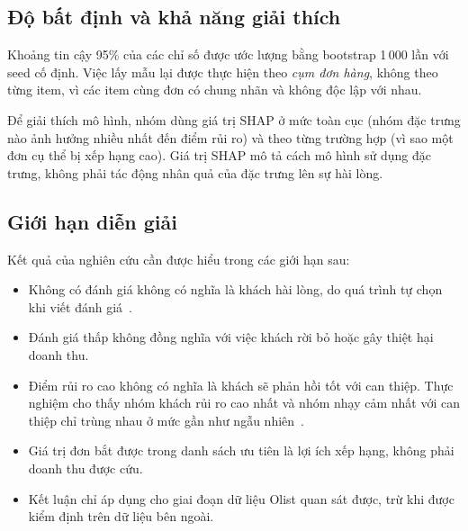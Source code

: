 \subsection{Độ bất định và khả năng giải thích}

Khoảng tin cậy 95\% của các chỉ số được ước lượng bằng bootstrap 1\,000 lần với seed cố định. Việc lấy mẫu lại được thực hiện theo \emph{cụm đơn hàng}, không theo từng item, vì các item cùng đơn có chung nhãn và không độc lập với nhau.

Để giải thích mô hình, nhóm dùng giá trị SHAP ở mức toàn cục (nhóm đặc trưng nào ảnh hưởng nhiều nhất đến điểm rủi ro) và theo từng trường hợp (vì sao một đơn cụ thể bị xếp hạng cao). Giá trị SHAP mô tả cách mô hình sử dụng đặc trưng, không phải tác động nhân quả của đặc trưng lên sự hài lòng.

\subsection{Giới hạn diễn giải}

Kết quả của nghiên cứu cần được hiểu trong các giới hạn sau:
\begin{itemize}
  \item Không có đánh giá không có nghĩa là khách hài lòng, do quá trình tự chọn khi viết đánh giá~\cite{li2008}.
  \item Đánh giá thấp không đồng nghĩa với việc khách rời bỏ hoặc gây thiệt hại doanh thu.
  \item Điểm rủi ro cao không có nghĩa là khách sẽ phản hồi tốt với can thiệp. Thực nghiệm cho thấy nhóm khách rủi ro cao nhất và nhóm nhạy cảm nhất với can thiệp chỉ trùng nhau ở mức gần như ngẫu nhiên~\cite{ascarza2018}.
  \item Giá trị đơn bắt được trong danh sách ưu tiên là lợi ích xếp hạng, không phải doanh thu được cứu.
  \item Kết luận chỉ áp dụng cho giai đoạn dữ liệu Olist quan sát được, trừ khi được kiểm định trên dữ liệu bên ngoài.
\end{itemize}
